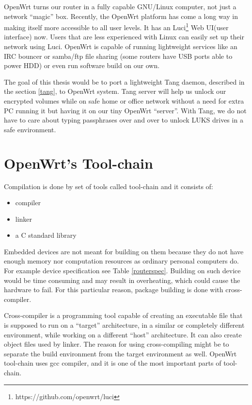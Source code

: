 OpenWrt turns our router in a fully capable GNU/Linux computer, not just a network “magic” box.
Recently, the OpenWrt platform has come a long way in making itself more accessible to all user levels.
It has an Luci\footnote{https://github.com/openwrt/luci} Web UI(user interface) now.
Users that are less experienced with Linux can easily set up their network using Luci.
OpenWrt is capable of running lightweight services like an IRC bouncer or samba/ftp file sharing (some routers have USB ports able to power HDD) or even run software build on our own\cite{vpnpick}.

The goal of this thesis would be to port a lightweight Tang daemon, described in the section \ref{tang}, to OpenWrt system.
Tang server will help us unlock our encrypted volumes while on safe home or office network without a need for extra PC running it but having it on our tiny OpenWrt “server”.
With Tang, we do not have to care about typing passphrases over and over to unlock LUKS drives in a safe environment.



\section{OpenWrt's Tool-chain}

Compilation is done by set of tools called tool-chain and it consists of:
\begin{itemize}
    \item compiler
    \item linker
    \item a C standard library
\end{itemize}

Embedded devices are not meant for building on them because they do not have enough memory nor computation resources as ordinary personal computers do.
For example device specification see Table \ref{routerspec}.
Building on such device would be time consuming and may result in overheating, which could cause the hardware to fail.
For this particular reason, package building is done with cross-compiler.

Cross-compiler is a programming tool capable of creating an executable file that is supposed to run on a “target” architecture, in a similar or completely different environment, while working on a different “host” architecture.
It can also create object files used by linker.
The reason for using cross-compiling might be to separate the build environment from the target environment as well.
OpenWrt tool-chain uses gcc compiler, and it is one of the most important parts of tool-chain.

